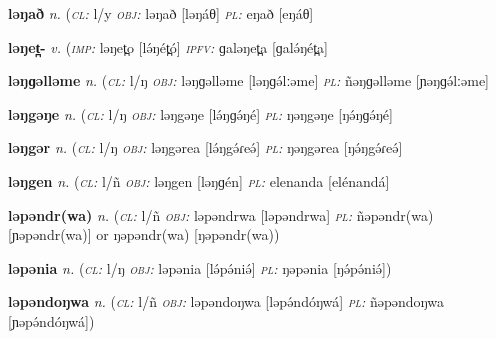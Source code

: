 \newentry
\headword\textbf{ləŋað} 
\ipa{[ləŋáθ]}
\synpos\textit{n.} 
\class(\textit{\textsc{cl:}} {l/y}
\object\textit{\textsc{obj:}} ləŋað [ləŋáθ]
\plural\textit{\textsc{pl:}} eŋað [eŋáθ]

\newentry
\headword\textbf{ləŋet̪-}  
\ipa{[lə́ŋét̪-]}
\synpos\textit{v.} 
\imperative(\textit {\textsc{imp:}} ləŋet̪o [lə́ŋét̪ó]  
\imperfective\textit{\textsc{ipfv:}} ɡaləŋet̪a [ɡalə́ŋét̪a]

\newentry
\headword\textbf{ləŋɡəlləme	} 
\synpos\textit{n.} 
\class(\textit{\textsc{cl:}} {l/ŋ}
\object\textit{\textsc{obj:}} ləŋɡəlləme [ləŋɡə́lːəme]
\plural\textit{\textsc{pl:}} ñəŋɡəlləme [ɲəŋɡə́lːəme]

\newentry
\headword\textbf{ləŋgəŋe}  
\ipa{[lə́ŋɡə́ŋé]}
\synpos\textit{n.} 
\class(\textit{\textsc{cl:}} {l/ŋ}
\object\textit{\textsc{obj:}} ləŋgəŋe [lə́ŋɡə́ŋé]
\plural\textit{\textsc{pl:}} ŋəŋgəŋe [ŋə́ŋɡə́ŋé]

\newentry
\headword\textbf{ləŋgər} %
\ipa{[lə́ŋgə́r]}
\synpos\textit{n.} 
\class(\textit{\textsc{cl:}} {l/ŋ}
\object\textit{\textsc{obj:}} ləŋgərea [lə́ŋgə́ɾeə́]
\plural\textit{\textsc{pl:}} ŋəŋgərea [ŋə́ŋgə́ɾeə́]

\newentry
\headword\textbf{ləŋgen}  
\ipa{[ləŋɡén]}
\synpos\textit{n.} 
\class(\textit{\textsc{cl:}} {l/ñ} %
\object\textit{\textsc{obj:}} ləŋgen [ləŋɡén]
\plural\textit{\textsc{pl:}} elenanda [elénandá]

\newentry
\headword\textbf{ləpəndr(wa)} 
\ipa{[ləpəndr(wa)]}
\synpos\textit{n.} 
\class(\textit{\textsc{cl:}} {l/ñ}
\object\textit{\textsc{obj:}} ləpəndrwa [ləpəndrwa]
\plural\textit{\textsc{pl:}} ñəpəndr(wa) [ɲəpəndr(wa)] or ŋəpəndr(wa) [ŋəpəndr(wa))


\newentry
\headword\textbf{ləpənia} 
\ipa{[lə́pə́niə́]}
\synpos\textit{n.} 
\class(\textit{\textsc{cl:}} {l/ŋ}
\object\textit{\textsc{obj:}} ləpənia [lə́pə́niə́]
\plural\textit{\textsc{pl:}} ŋəpənia [ŋə́pə́niə́])

\newentry
\headword\textbf{ləpəndoŋwa} 
\synpos\textit{n.} 
\class(\textit{\textsc{cl:}} {l/ñ}
\object\textit{\textsc{obj:}} ləpəndoŋwa [ləpə́ndóŋwá]
\plural\textit{\textsc{pl:}} ñəpəndoŋwa [ɲəpə́ndóŋwá])
	
